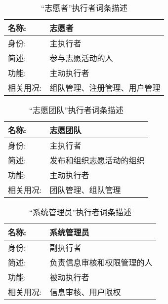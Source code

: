 
\begin{table}[H]  
\caption{“志愿者”执行者词条描述}  
\begin{center}  
    \begin{tabular}{l p{11cm}} 
        \hline
        \quad 名称:  & 志愿者 \\
        \hline
        \quad 身份:  & 主执行者 \\
        \hline
        \quad 简述:  & 参与志愿活动的人 \\
        \hline
        \quad 功能:  & 主动执行者 \\
        \hline
        \quad 相关用况:  & 组队管理、注册管理、用户管理 \\
        \hline
    \end{tabular}
\end{center}
\end{table}

\begin{table}[H]  
\caption{“志愿团队”执行者词条描述}  
\begin{center}  
    \begin{tabular}{l p{11cm}} 
        \hline
        \quad 名称:  &   志愿团队 \\
        \hline
        \quad 身份:  & 主执行者 \\
        \hline
        \quad 简述:  & 发布和组织志愿活动的组织 \\
        \hline
        \quad 功能:  & 主动执行者 \\
        \hline
        \quad 相关用况:  & 团队管理、组队管理 \\
        \hline
    \end{tabular}
\end{center}
\end{table}


\begin{table}[H]  
\caption{“系统管理员”执行者词条描述}  
\begin{center}  
    \begin{tabular}{l p{11cm}} 
        \hline
        \quad 名称:  &  系统管理员 \\
        \hline
        \quad 身份:  & 副执行者 \\
        \hline
        \quad 简述:  & 负责信息审核和权限管理的人 \\
        \hline
        \quad 功能:  & 被动执行者 \\
        \hline
        \quad 相关用况:  & 信息审核、用户限权 \\
        \hline
    \end{tabular}
\end{center}
\end{table}
